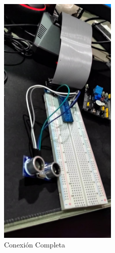 \begin{figure}[h]
	\centering
	\includegraphics[width=0.5\textwidth]{imagenes/foto3}
	\caption{Conexión Completa}
\end{figure}
